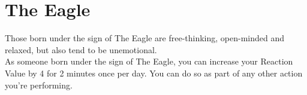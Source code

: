 \section{The Eagle}

Those born under the sign of The Eagle are free-thinking, open-minded and relaxed, but also tend to be unemotional.\\
As someone born under the sign of The Eagle, you can increase your Reaction Value by 4 for 2 minutes once per day. You can do so as part of any other action you're performing.\\